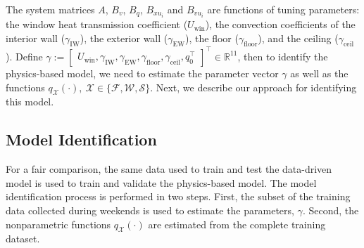 The system matrices $A$, $B_v$, $B_q$, $B_{xu_i}$ and $B_{vu_i}$ are functions of tuning parameters: the window heat transmission coefficient ($U_\text{win}$), the convection coefficients of the interior wall ($\gamma_\text{IW}$), the exterior wall ($\gamma_\text{EW}$), the floor ($\gamma_\text{floor}$), and the ceiling ($\gamma_\text{ceil}$). 
Define $\gamma := \begin{bmatrix} U_\text{win}, \gamma_\text{IW}, \gamma_\text{EW}, \gamma_\text{floor}, \gamma_\text{ceil}, q^{\top}_0 \end{bmatrix}^\top \in \mathbb{R}^{11}$, then to identify the physics-based model, we need to estimate the parameter vector $\gamma$ as well as the functions $q_{\mathcal{X}}(\cdot),~\mathcal{X} \in \{\mathcal{F}, \mathcal{W}, \mathcal{S}\}$.
Next, we describe our approach for identifying this model.

\subsection{Model Identification}\label{sec:physics_id}

For a fair comparison, the same data used to train and test the data-driven model is used to train and validate the physics-based model. 
The model identification process is performed in two steps. First, the subset of the training data collected during weekends is used to estimate the parameters, $\gamma$. Second, the nonparametric functions $q_{\mathcal{X}}(\cdot)$ are estimated from the complete training dataset.

\vspace*{0.2cm}
